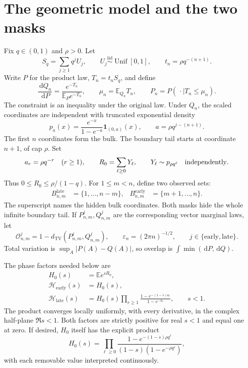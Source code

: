 \documentclass[11pt,oneside]{article}
\theoremstyle{remark}\newtheorem{remark}[theorem]{Remark}
\newcommand{\E}{\mathbb E}
\newcommand{\dd}{\,\mathrm d}
\newcommand{\eps}{\varepsilon}
\newcommand{\TV}{d_{\mathrm{TV}}}
\newcommand{\ind}{\mathbf 1}
\newcommand{\OO}{\mathcal O}
\newcommand{\HH}{\mathcal H}
\numberwithin{equation}{section}
\begin{document}
\section{The geometric model and the two masks}
Fix $q\in(0,1)$ and $\rho>0$. Let
\begin{equation}
 S_q=\sum_{j\ge1}q^jU_j,\qquad U_j\overset{\mathrm{iid}}\sim
 \operatorname{Unif}[0,1],\qquad t_n=\rho q^{-(n+1)}.
\end{equation}
Write $P$ for the product law, $T_n=t_nS_q$, and define
\begin{equation}
 \frac{\dd Q_n}{\dd P}=\frac{e^{-T_n}}{\E_P e^{-T_n}},\qquad
 \mu_n=\E_{Q_n}T_n,\qquad P_n=P(\,\cdot\mid T_n\le\mu_n).
 \label{eq:model}
\end{equation}
The constraint is an inequality under the original law. Under $Q_n$,
the scaled coordinates are independent with truncated exponential density
\begin{equation}
 p_a(x)=\frac{e^{-x}}{1-e^{-a}}\ind_{(0,a)}(x),\qquad
 a=\rho q^{j-(n+1)}.
\end{equation}
The first $n$ coordinates form the bulk. The boundary tail starts at
coordinate $n+1$, of cap $\rho$. Set
\begin{equation}
 a_r=\rho q^{-r}\quad(r\ge1),\qquad
 R_0=\sum_{\ell\ge0}Y_\ell,\qquad Y_\ell\sim p_{\rho q^\ell}
 \quad\hbox{independently}.
 \label{eq:tail}
\end{equation}
Thus $0\le R_0\le\rho/(1-q)$. For $1\le m<n$, define two observed sets:
\begin{align}
 B^{\mathrm{late}}_{n,m}&=\{1,\ldots,n-m\},
 &B^{\mathrm{early}}_{n,m}&=\{m+1,\ldots,n\}.
 \label{eq:masks}
\end{align}
The superscript names the hidden bulk coordinates. Both masks hide the
whole infinite boundary tail. If $P^j_{n,m},Q^j_{n,m}$ are the corresponding
vector marginal laws, let
\begin{equation}
 \OO^j_{n,m}=1-\TV(P^j_{n,m},Q^j_{n,m}),\qquad
 \eps_n=(2\pi n)^{-1/2},\qquad j\in\{\mathrm{early},\mathrm{late}\}.
\end{equation}
Total variation is $\sup_A|P(A)-Q(A)|$, so overlap is
$\int\min(\dd P,\dd Q)$.

The phase factors needed below are
\begin{align}
 H_0(s)&=\E e^{sR_0},\label{eq:H0}\\
 \HH_{\mathrm{early}}(s)&=H_0(s),\label{eq:HE}\\
 \HH_{\mathrm{late}}(s)&=H_0(s)
 \prod_{r\ge1}\frac{1-e^{-(1-s)a_r}}{1-e^{-a_r}},\qquad s<1.
 \label{eq:HL}
\end{align}
The product converges locally uniformly, with every derivative, in the
complex half-plane $\Re s<1$. Both factors are strictly positive for
real $s<1$ and equal one at zero. If desired, $H_0$ itself has the
explicit product
\begin{equation}
 H_0(s)=\prod_{\ell\ge0}
 \frac{1-e^{-(1-s)\rho q^\ell}}
 {(1-s)(1-e^{-\rho q^\ell})},
 \label{eq:H0product}
\end{equation}
with each removable value interpreted continuously.
\end{document}
